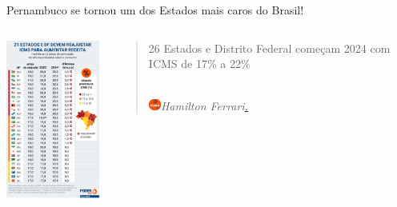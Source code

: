 \documentclass[compress,12pt]{beamer}
\begin{document}
\begin{frame}{Pernambuco se tornou um dos Estados mais caros do Brasil!}
\centering

    \begin{columns}
    
        \centering
        
        \includegraphics[width=4cm]{Imagens/Captura de tela 2024-03-24 163619.png}

        \centering


\begin{tcolorbox}[newspaper]
\begin{quote}
\small
\vspace{-1mm}


26 Estados e Distrito Federal começam 2024 com ICMS de 17\% a 22\%

 \\
\textit{\includegraphics[width=4mm]{Imagens/logo-poder360-1-1.png.jpg}Hamilton Ferrari\href{https://www.poder360.com.br/economia/26-estados-e-distrito-federal-comecam-2024-com-icms-de-17-a-22/}{.}}
\end{quote}
\end{tcolorbox}
\end{columns}
\end{frame}
\end{document}
